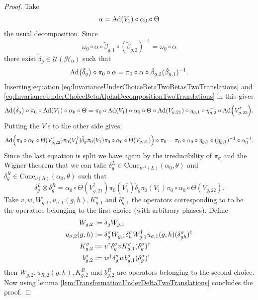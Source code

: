 \documentclass[12pt,a4paper,twoside]{article}
\newcommand{\defeq}{\vcentcolon=}
\let\originalleft\left
\let\originalright\right
\renewcommand{\left}{\mathopen{}\mathclose\bgroup\originalleft}
\renewcommand{\right}{\aftergroup\egroup\originalright}
\newcommand{\UU}{\mathcal U}
\newcommand{\HH}{\mathcal H}
\newcommand{\Ad}[1]{\textrm{Ad}\left(#1\right)}
\theoremstyle{definition}
\numberwithin{equation}{section}
\begin{document}
\begin{proof}
		Take 
	\begin{equation}\label{eq:InvarianceUnderChoiceBetaAlphaDecompositionTwoTranslations}
		\alpha=\Ad{V_1}\circ\alpha_{0}\circ\Theta
	\end{equation}
	the usual decomposition. Since
	\begin{equation}
		\omega_0\circ\alpha\circ\tilde{\beta}_{g,1}\circ(\tilde{\beta}_{g,2})^{-1}=\omega_0\circ\alpha
	\end{equation}
	there exist $\tilde{\delta}_g\in\UU(\HH_0)$ such that
	\begin{equation}
		\Ad{\tilde{\delta}_g}\circ\pi_0\circ\alpha=\pi_0\circ\alpha\circ\tilde{\beta}_{g,2}(\tilde{\beta}_{g,1})^{-1}.
	\end{equation}
	Inserting equation \eqref{eq:InvarianceUnderChoiceBetaTwoBetasTwoTranslations} and \eqref{eq:InvarianceUnderChoiceBetaAlphaDecompositionTwoTranslations} in this gives
	\begin{equation}
		\Ad{\tilde{\delta}_g}\circ\pi_0\circ\Ad{V_1}\circ\alpha_0\circ\Theta=\pi_0\circ\Ad{V_1}\circ\alpha_0\circ\Theta\circ\Ad{V_{g,21}}\circ\eta_{g,1}\circ\eta_{g,2}^{-1}\circ\Ad{V_{g,22}^\dagger}.
	\end{equation}
	Putting the $V$'s to the other side gives:
	\begin{equation}
		\Ad{\pi_0\circ\alpha_0\circ\Theta(V_{g,22}^\dagger)\pi_0(V_1^\dagger)\tilde{\delta}_g\pi_0(V_1)\pi_0\circ\alpha_0\circ\Theta(V_{g,21})}\circ\pi_0=\pi_0\circ\alpha_0\circ\eta_{g,2}\circ(\eta_{g,1})^{-1}\circ\alpha_0^{-1}.
	\end{equation}
	Since the last equation is split we have again by the irreducibility of $\pi_\sigma$ and the Wigner theorem that we can take $\delta_g^L\in\textrm{Cone}_{\nu^{-1}(L)}(\alpha_0,\theta)$ and $\delta_g^R\in\textrm{Cone}_{\nu(R)}(\alpha_0,\theta)$ such that
	\begin{equation}
		\delta_g^L\otimes\delta_g^R=\alpha_0\circ\Theta(V_{g,21}^\dagger)\pi_0(V_1^\dagger)\tilde{\delta}_g\pi_0(V_1)\pi_0\circ\alpha_0\circ\Theta(V_{g,22}).
	\end{equation}
	Take $v,w,W_{g,1},u_{\sigma,1}(g,h),K_{g,1}^\sigma$ and $b_{g,1}^\sigma$ the operators corresponding to to be the operators belonging to the first choice (with arbitrary phases). Define
	\begin{align}
		W_{g,2}&\defeq\delta_g W_{g,1}\\
		u_{\sigma,2}(g,h)&\defeq \delta_g^\sigma W_{g,1}\delta_h^\sigma W_{g,1}^\dagger u_{\sigma,1}(g,h)(\delta_{gh}^\sigma)^\dagger\\
		K^\sigma_{g,2}&\defeq v^\dagger \delta_g^\sigma v K_{g,1}^\sigma (\delta_g^\sigma)^\dagger\\
		b_{g,2}^\sigma&\defeq w^\dagger\delta^\sigma_g w b_{g,1}^\sigma (\delta^\sigma_g)^\dagger
	\end{align}
	then $W_{g,2},u_{R,2}(g,h),K^R_{g,2}$ and $b^R_{g,2}$ are operators belonging to the second choice. Now using lemma \ref{lem:TransformationUnderDeltaTwoTranslations} concludes the proof.
\end{proof}
\end{document}
